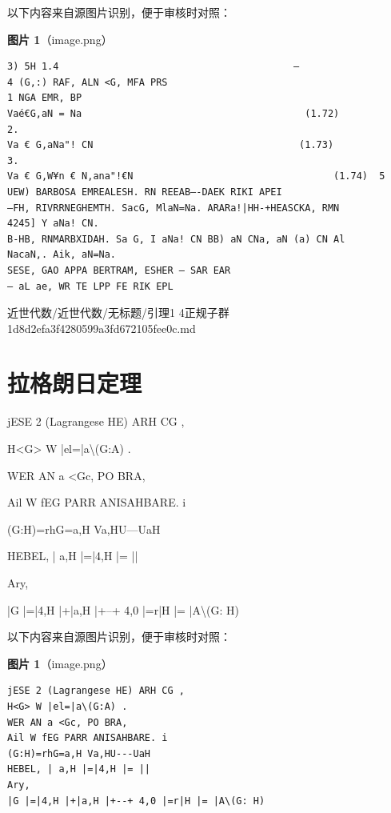 \begin{note}
以下内容来自源图片识别，便于审核时对照：

\textbf{图片 1}（image.png）
\begin{Verbatim}[fontsize=\small]
3) 5H 1.4                                         —
4 (G,:) RAF, ALN <G, MFA PRS
1 NGA EMR, BP
Vaé€G,aN = Na                                       (1.72)
2.
Va € G,aNa"! CN                                    (1.73)
3.
Va € G,W¥n € N,ana"!€N                                   (1.74)  5
UEW) BARBOSA EMREALESH. RN REEAB—-DAEK RIKI APEI
—FH, RIVRRNEGHEMTH. SacG, MlaN=Na. ARARa!|HH-+HEASCKA, RMN
4245] Y aNa! CN.
B-HB, RNMARBXIDAH. Sa G, I aNa! CN BB) aN CNa, aN (a) CN Al
NacaN,. Aik, aN=Na.
SESE, GAO APPA BERTRAM, ESHER — SAR EAR
— aL ae, WR TE LPP FE RIK EPL
\end{Verbatim}

\end{note}

\begin{note}[来源路径]

近世代数/近世代数/无标题/引理1 4正规子群 1d8d2efa3f4280599a3fd672105fee0c.md

\end{note}

\section*{拉格朗日定理}

\begin{theorem}[拉格朗日定理]

jESE 2 (Lagrangese HE) ARH CG ,

H<G> W |el=|a\textbackslash{}(G:A) .

WER AN a <Gc, PO BRA,

Ail W fEG PARR ANISAHBARE. i

(G:H)=rhG=a,H Va,HU---UaH

HEBEL, | a,H |=|4,H |= ||

Ary,

|G |=|4,H |+|a,H |+--+ 4,0 |=r|H |= |A\textbackslash{}(G: H)

\end{theorem}

\begin{note}
以下内容来自源图片识别，便于审核时对照：

\textbf{图片 1}（image.png）
\begin{Verbatim}[fontsize=\small]
jESE 2 (Lagrangese HE) ARH CG ,
H<G> W |el=|a\(G:A) .
WER AN a <Gc, PO BRA,
Ail W fEG PARR ANISAHBARE. i
(G:H)=rhG=a,H Va,HU---UaH
HEBEL, | a,H |=|4,H |= ||
Ary,
|G |=|4,H |+|a,H |+--+ 4,0 |=r|H |= |A\(G: H)
\end{Verbatim}

\end{note}

